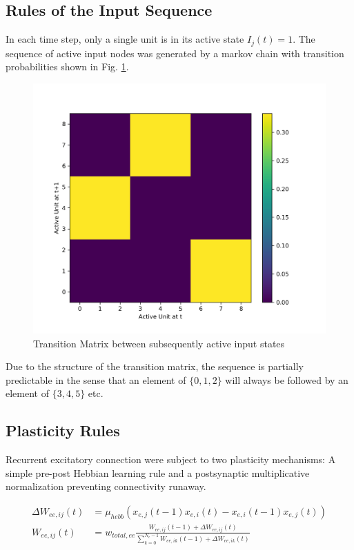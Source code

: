 \documentclass[10pt,a4paper]{article}
\begin{document}
\subsection{Rules of the Input Sequence}

In each time step, only a single unit is in its active state $I_j(t) = 1$. The sequence of active input nodes was generated by a markov chain with transition probabilities shown in Fig. \ref{fig:grammar_markov}.

\begin{figure}
\includegraphics[width=\textwidth]{../../plots/Grammar_Markov.png}
\caption{\label{fig:grammar_markov} Transition Matrix between subsequently active input states}
\end{figure}

Due to the structure of the transition matrix, the sequence is partially predictable in the sense that an element of $\{0,1,2\}$ will always be followed by an element of $\{3,4,5\}$ etc.

\subsection{Plasticity Rules}

Recurrent excitatory connection were subject to two plasticity mechanisms: A simple pre-post Hebbian learning rule and a postsynaptic multiplicative normalization preventing connectivity runaway.

\begin{align}
\Delta W_{ee,ij}(t) &= \mu_{hebb} \left( x_{e,j}(t-1)x_{e,i}(t) - x_{e,i}(t-1)x_{e,j}(t) \right) \\
W_{ee,ij}(t) &= w_{total,ee}\frac{W_{ee,ij}(t-1) + \Delta W_{ee,ij}(t)}{\sum_{k=0}^{N_e - 1} W_{ee,ik}(t-1) + \Delta W_{ee,ik}(t)}
\end{align}
\end{document}
